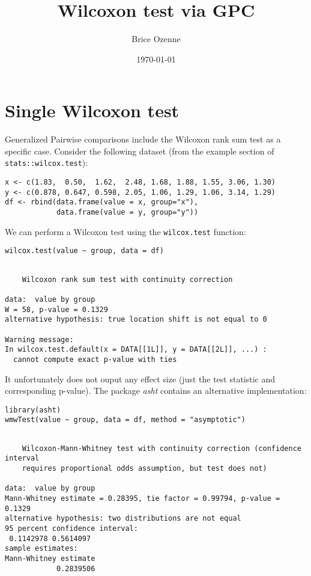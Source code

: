 \documentclass[12pt]{article}
\author{Brice Ozenne}
\date{\today}
\title{Wilcoxon test via GPC}
\begin{document}
\maketitle

\section{Single Wilcoxon test}
\label{sec:org00cb9cb}

Generalized Pairwise comparisons include the Wilcoxon rank sum test as
a specific case. \newline Consider the following dataset (from the example
section of \texttt{stats::wilcox.test}):
\lstset{language=r,label= ,caption= ,captionpos=b,numbers=none}
\begin{lstlisting}
x <- c(1.83,  0.50,  1.62,  2.48, 1.68, 1.88, 1.55, 3.06, 1.30)
y <- c(0.878, 0.647, 0.598, 2.05, 1.06, 1.29, 1.06, 3.14, 1.29)
df <- rbind(data.frame(value = x, group="x"),
            data.frame(value = y, group="y"))
\end{lstlisting}

We can perform a Wilcoxon test using the \texttt{wilcox.test} function:
\lstset{language=r,label= ,caption= ,captionpos=b,numbers=none}
\begin{lstlisting}
wilcox.test(value ~ group, data = df)
\end{lstlisting}

\begin{verbatim}

	Wilcoxon rank sum test with continuity correction

data:  value by group
W = 58, p-value = 0.1329
alternative hypothesis: true location shift is not equal to 0

Warning message:
In wilcox.test.default(x = DATA[[1L]], y = DATA[[2L]], ...) :
  cannot compute exact p-value with ties
\end{verbatim}

It unfortunately does not ouput any effect size (just the test
statistic and corresponding p-value). The package \emph{asht} contains an
alternative implementation:
\lstset{language=r,label= ,caption= ,captionpos=b,numbers=none}
\begin{lstlisting}
library(asht)
wmwTest(value ~ group, data = df, method = "asymptotic")
\end{lstlisting}

\begin{verbatim}

	Wilcoxon-Mann-Whitney test with continuity correction (confidence interval
	requires proportional odds assumption, but test does not)

data:  value by group
Mann-Whitney estimate = 0.28395, tie factor = 0.99794, p-value = 0.1329
alternative hypothesis: two distributions are not equal
95 percent confidence interval:
 0.1142978 0.5614097
sample estimates:
Mann-Whitney estimate 
            0.2839506
\end{verbatim}
\end{document}
